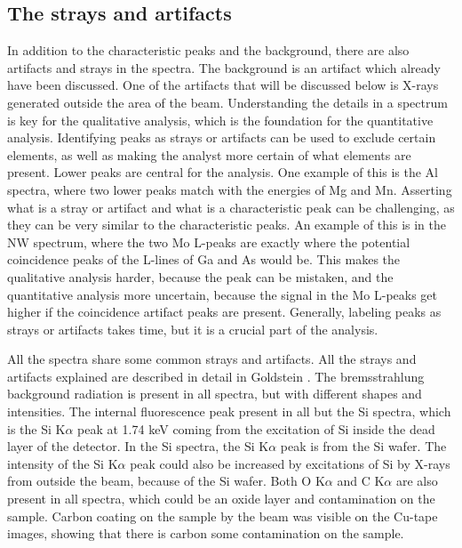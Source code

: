 \subsection{The strays and artifacts}
\label{sec:discussion:general:strays}

In addition to the characteristic peaks and the background, there are also artifacts and strays in the spectra. %
The background is an artifact which already have been discussed.
One of the artifacts that will be discussed below is X-rays generated outside the area of the beam.
Understanding the details in a spectrum is key for the qualitative analysis, which is the foundation for the quantitative analysis.
Identifying peaks as strays or artifacts can be used to exclude certain elements, as well as making the analyst more certain of what elements are present.
Lower peaks are central for the analysis.
One example of this is the Al spectra, where two lower peaks match with the energies of Mg and Mn.
Asserting what is a stray or artifact and what is a characteristic peak can be challenging, as they can be very similar to the characteristic peaks.
An example of this is in the NW spectrum, where the two Mo L-peaks are exactly where the potential coincidence peaks of the L-lines of Ga and As would be.
This makes the qualitative analysis harder, because the peak can be mistaken, and the quantitative analysis more uncertain, because the signal in the Mo L-peaks get higher if the coincidence artifact peaks are present.
Generally, labeling peaks as strays or artifacts takes time, but it is a crucial part of the analysis.

All the spectra share some common strays and artifacts.
All the strays and artifacts explained are described in detail in Goldstein \cite{goldstein_scanning_2018}.
The bremsstrahlung background radiation is present in all spectra, but with different shapes and intensities.
The internal fluorescence peak present in all but the Si spectra, which is the Si K$\alpha$ peak at 1.74 keV coming from the excitation of Si inside the dead layer of the detector.
In the Si spectra, the Si K$\alpha$ peak is from the Si wafer.
The intensity of the Si K$\alpha$ peak could also be increased by excitations of Si by X-rays from outside the beam, because of the Si wafer.
Both O K$\alpha$ and C K$\alpha$ are also present in all spectra, which could be an oxide layer and contamination on the sample.
Carbon coating on the sample by the beam was visible on the Cu-tape images, showing that there is carbon some contamination on the sample.


